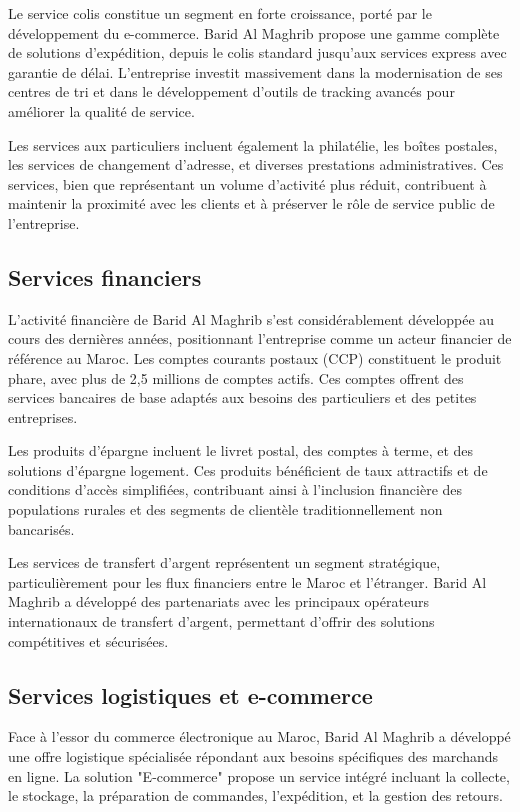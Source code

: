 Le service colis constitue un segment en forte croissance, porté par le développement du e-commerce. Barid Al Maghrib propose une gamme complète de solutions d'expédition, depuis le colis standard jusqu'aux services express avec garantie de délai. L'entreprise investit massivement dans la modernisation de ses centres de tri et dans le développement d'outils de tracking avancés pour améliorer la qualité de service.

Les services aux particuliers incluent également la philatélie, les boîtes postales, les services de changement d'adresse, et diverses prestations administratives. Ces services, bien que représentant un volume d'activité plus réduit, contribuent à maintenir la proximité avec les clients et à préserver le rôle de service public de l'entreprise.

\subsection{Services financiers}

L'activité financière de Barid Al Maghrib s'est considérablement développée au cours des dernières années, positionnant l'entreprise comme un acteur financier de référence au Maroc. Les comptes courants postaux (CCP) constituent le produit phare, avec plus de 2,5 millions de comptes actifs. Ces comptes offrent des services bancaires de base adaptés aux besoins des particuliers et des petites entreprises.

Les produits d'épargne incluent le livret postal, des comptes à terme, et des solutions d'épargne logement. Ces produits bénéficient de taux attractifs et de conditions d'accès simplifiées, contribuant ainsi à l'inclusion financière des populations rurales et des segments de clientèle traditionnellement non bancarisés.

Les services de transfert d'argent représentent un segment stratégique, particulièrement pour les flux financiers entre le Maroc et l'étranger. Barid Al Maghrib a développé des partenariats avec les principaux opérateurs internationaux de transfert d'argent, permettant d'offrir des solutions compétitives et sécurisées.

\subsection{Services logistiques et e-commerce}

Face à l'essor du commerce électronique au Maroc, Barid Al Maghrib a développé une offre logistique spécialisée répondant aux besoins spécifiques des marchands en ligne. La solution "E-commerce" propose un service intégré incluant la collecte, le stockage, la préparation de commandes, l'expédition, et la gestion des retours.

